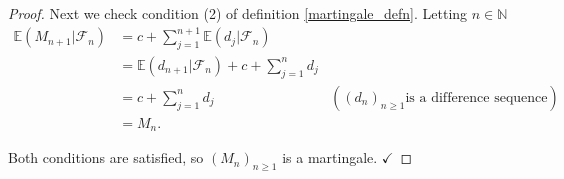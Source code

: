 \begin{proof}
    Next we check condition (2) of definition \ref{martingale_defn}. Letting \(n \in \mathbb{N}\)
    \begin{align*}
        \mathbb{E}(M_{n+1}|\mathcal{F}_{n}) &= c + \sum\limits_{j=1}^{n+1} \mathbb{E}(d_{j}|\mathcal{F}_{n}) \\
        &= \mathbb{E}(d_{n+1}|\mathcal{F}_{n}) +  c + \sum\limits_{j=1}^{n} d_{j} \\
        &=c + \sum\limits_{j=1}^{n} d_{j} & ((d_{n})_{n \geq 1} \text{is a difference sequence})\\
        &= M_{n}.
    \end{align*}

    Both conditions are satisfied, so \((M_{n})_{n \geq 1}\) is a martingale. \(\checkmark\)
\end{proof}

